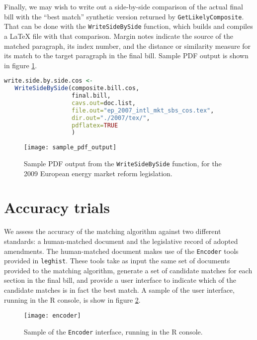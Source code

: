 \documentclass[11pt]{article}
\begin{document}
Finally, we may wish to write out a side-by-side comparison of the
actual final bill with the ``best match'' synthetic version returned
by \texttt{GetLikelyComposite}. That can be done with the
\texttt{WriteSideBySide} function, which builds and compiles a \LaTeX
file with that comparison. Margin notes indicate the source of the
matched paragraph, its index number, and the distance or similarity
measure for its match to the target paragraph in the final
bill. Sample PDF output is shown in figure \ref{fig:pdf-output}.

\begin{lstlisting}[language=R]
write.side.by.side.cos <- 
   WriteSideBySide(composite.bill.cos,
                   final.bill,
                   cavs.out=doc.list,
                   file.out="ep_2007_intl_mkt_sbs_cos.tex",
                   dir.out="./2007/tex/",
                   pdflatex=TRUE
                   )
\end{lstlisting}

\begin{figure}[ht]
  \centering
  \texttt{[image: sample\_pdf\_output]}
  \label{fig:pdf-output}
  \caption{Sample PDF output from the \texttt{WriteSideBySide} function, for the 2009 European energy market reform legislation.}
\end{figure}

\section{Accuracy trials}
\label{sec:accuracy-trials}

We assess the accuracy of the matching algorithm against two different
standards: a human-matched document and the legislative record of
adopted amendments. The human-matched document makes use of the
\texttt{Encoder} tools provided in \texttt{leghist}. These tools take
as input the same set of documents provided to the matching algorithm,
generate a set of candidate matches for each section in the final
bill, and provide a user interface to indicate which of the candidate
matches is in fact the best match. A sample of the user interface,
running in the R console, is show in figure \ref{fig:encoder-interface}.

\begin{figure}[ht]
  \centering
  \texttt{[image: encoder]}
  \caption{Sample of the \texttt{Encoder} interface, running in the R console. }
  \label{fig:encoder-interface}
\end{figure}
\end{document}
